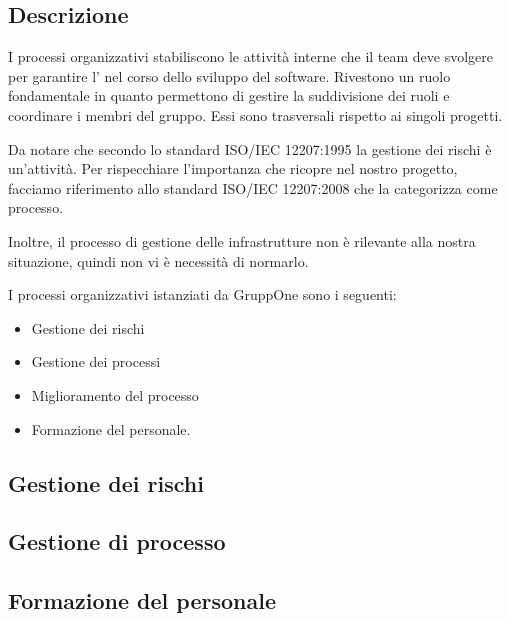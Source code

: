 \documentclass[../norme-di-progetto.tex]{subfiles}
\begin{document}
\subsection{Descrizione}%
\label{sub:processi_organizzativi/descrizione}

I processi organizzativi stabiliscono le attività interne che il team deve svolgere per garantire l' nel corso dello sviluppo del software.
Rivestono un ruolo fondamentale in quanto permettono di gestire la suddivisione dei ruoli e coordinare i membri del gruppo.
Essi sono trasversali rispetto ai singoli progetti.

Da notare che secondo lo standard ISO/IEC 12207:1995 la gestione dei rischi è un'attività.
Per rispecchiare l'importanza che ricopre nel nostro progetto, facciamo riferimento allo standard ISO/IEC 12207:2008 che la categorizza come processo.

Inoltre, il processo di gestione delle infrastrutture non è rilevante alla nostra situazione, quindi non vi è necessità di normarlo.

I processi organizzativi istanziati da GruppOne sono i seguenti:

\begin{itemize}
  \item Gestione dei rischi
  \item Gestione dei processi
  \item Miglioramento del processo
  \item Formazione del personale.
\end{itemize}

\subsection{Gestione dei rischi}%
\label{sub:gestione_dei_rischi}



\subsection{Gestione di processo}%
\label{sub:gestione_di_processo}




% 

\subsection{Formazione del personale}%
\label{sub:formazione_del_personale}


\end{document}
